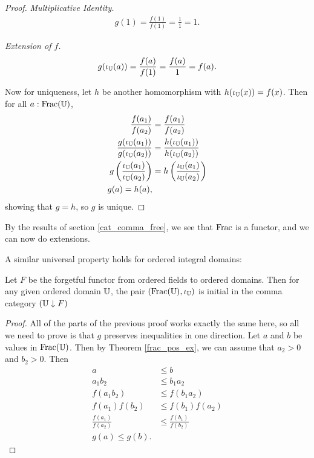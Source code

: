 \documentclass[../../math.tex]{subfiles}
\begin{document}
\begin{proof}
    \textit{Multiplicative Identity.}
    \begin{align*}
        g(1) = \frac{f(1)}{f(1)} = \frac{1}{1} = 1.
    \end{align*}

    \textit{Extension of $f$.}
    \begin{align*}
        g(\iota_{\mathbb{U}}(a)) = \frac{f(a)}{f(1)} = \frac{f(a)}{1} = f(a).
    \end{align*}

    Now for uniqueness, let $h$ be another homomorphism with $h(\iota_{\mathbb{U}}(x)) =
    f(x)$.  Then for all $a : \operatorname{Frac}(\mathbb{U})$,
    \begin{align*}
        \frac{f(a_1)}{f(a_2)} &= \frac{f(a_1)}{f(a_2)} \\
        \frac{g(\iota_{\mathbb{U}}(a_1))}{g(\iota_{\mathbb{U}}(a_2))} &=
            \frac{h(\iota_{\mathbb{U}}(a_1))}{h(\iota_{\mathbb{U}}(a_2))} \\
        g \left( \frac{\iota_{\mathbb{U}}(a_1)}{\iota_{\mathbb{U}}(a_2)} \right) &=
            h \left( \frac{\iota_{\mathbb{U}}(a_1)}{\iota_{\mathbb{U}}(a_2)} \right) \\
        g(a) = h(a),
    \end{align*}
    showing that $g = h$, so $g$ is unique.
\end{proof}

By the results of section \ref{cat_comma_free}, we see that $\operatorname{Frac}$ is a
functor, and we can now do extensions.

A similar universal property holds for ordered integral domains:

\begin{theorem}
    Let $F$ be the forgetful functor from ordered fields to ordered domains.
    Then for any given ordered domain $\mathbb{U}$, the pair $(\operatorname{Frac}(\mathbb{U}), \iota_{\mathbb{U}})$ is
    initial in the comma category $(\mathbb{U} \downarrow F)$
\end{theorem}
\begin{proof}
    All of the parts of the previous proof works exactly the same here, so all
    we need to prove is that $g$ preserves inequalities in one direction.  Let
    $a$ and $b$ be values in $\operatorname{Frac}(\mathbb{U})$.  Then by Theorem \ref{frac_pos_ex}, we
    can assume that $a_2 > 0$ and $b_2 > 0$.  Then
    \begin{align*}
        a &\leq b \\
        a_1b_2 &\leq b_1a_2 \\
        f(a_1b_2) &\leq f(b_1a_2) \\
        f(a_1)f(b_2) &\leq f(b_1)f(a_2) \\
        \frac{f(a_1)}{f(a_2)} &\leq \frac{f(b_1)}{f(b_2)} \\
        g(a) \leq g(b).
    \end{align*}
\end{proof}
\end{document}
